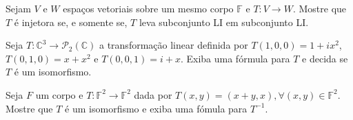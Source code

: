 \begin{questions}
  \begin{solutionordottedlines}
  \end{solutionordottedlines}

  \question\label{exercício:2.10}

  Sejam $V$ e $W$ espaços vetoriais sobre um mesmo corpo $\mathbb{F}$
  e $T\colon V\to W$.
  Mostre que $T$ é injetora se, e somente se, $T$ leva subconjunto LI
  em subconjunto LI.

  \begin{solutionordottedlines}
  \end{solutionordottedlines}

  \question\label{exercício:2.11}

  Seja
  $T\colon\mathbb{C}^{3}\to\mathcal{P}_{2}\left(\mathbb{C}\right)$
  a transformação linear definida por
  $T\left(1,0,0\right)=1+ix^{2}$,
  $T\left(0,1,0\right)=x+x^{2}$ e
  $T\left(0,0,1\right)=i+x$.
  Exiba uma fórmula para $T$ e decida se $T$ é um isomorfismo.

  \begin{solutionordottedlines}
  \end{solutionordottedlines}

  \question\label{exercício:2.12}

  Seja $F$ um corpo e $T\colon\mathbb{F}^{2}\to\mathbb{F}^{2}$ dada
  por
  \begin{math}
    T\left(x,y\right)=
    \left(x+y,x\right),
    \forall\left(x,y\right)\in
    \mathbb{F}^{2}
  \end{math}.
  Mostre que $T$ é um isomorfismo e exiba uma fómula para $T^{-1}$.

  \begin{solutionordottedlines}
  \end{solutionordottedlines}


\end{questions}
